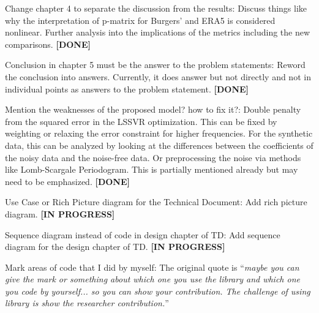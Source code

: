 \documentclass[a4paper,12pt]{scrreprt}
\begin{document}
\begin{numdesc}
    \item[Change chapter 4 to separate the discussion from the results:] Discuss things like why the interpretation of p-matrix for Burgers' and ERA5 is considered nonlinear. Further analysis into the implications of the metrics including the new comparisons. \textbf{[DONE]}
    \item[Conclusion in chapter 5 must be the answer to the problem statements:] Reword the conclusion into answers. Currently, it does answer but not directly and not in individual points as answers to the problem statement. \textbf{[DONE]}
    \item[Mention the weaknesses of the proposed model? how to fix it?:] Double penalty from the squared error in the LSSVR optimization. This can be fixed by weighting or relaxing the error constraint for higher frequencies. For the synthetic data, this can be analyzed by looking at the differences between the coefficients of the noisy data and the noise-free data. Or preprocessing the noise via methods like Lomb-Scargale Periodogram. This is partially mentioned already but may need to be emphasized. \textbf{[DONE]}
    \item[Use Case or Rich Picture diagram for the Technical Document:] Add rich picture diagram. \textbf{[IN PROGRESS]}
    \item[Sequence diagram instead of code in design chapter of TD:] Add sequence diagram for the design chapter of TD. \textbf{[IN PROGRESS]}
    \item[Mark areas of code that I did by myself:] The original quote is \enquote{\emph{maybe you can give the mark or something about which one you use the library and which one you code by yourself... so you can show your contribution. The challenge of using library is show the researcher contribution.}}


\end{numdesc}
\end{document}
